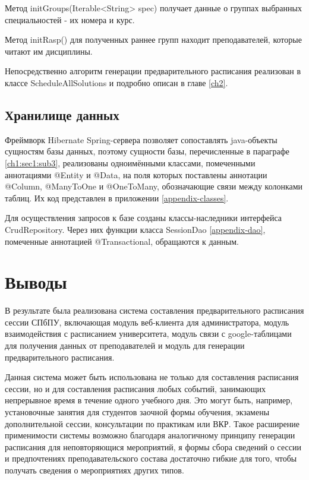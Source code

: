Метод initGroups(Iterable<String> spec) получает данные о группах выбранных специальностей - их номера и курс.

Метод initRasp() для полученных раннее групп находит преподавателей, которые читают им дисциплины.

Непосредственно алгоритм генерации предварительного расписания реализован в классе ScheduleAllSolutions и подробно описан в главе \ref{ch2}.

\subsection{Хранилище данных}
Фреймворк Hibernate Spring-сервера позволяет сопоставлять java-объекты сущностям базы данных, поэтому сущности базы, перечисленные в параграфе \ref{ch1:sec1:sub3}, реализованы одноимёнными классами, помеченными аннотациями @Entity и @Data, на поля которых поставлены аннотации @Column, @ManyToOne и @OneToMany, обозначающие связи между колонками таблиц. Их код представлен в приложении \ref{appendix-classes}.

Для осуществления запросов к базе созданы классы-наследники интерфейса CrudRepository. Через них функции класса SessionDao \ref{appendix-dao}, помеченные аннотацией @Transactional, обращаются к данным.

\section{Выводы}

В результате была реализована система составления предварительного расписания сессии СПбПУ, включающая модуль веб-клиента для администратора, модуль взаимодействия с расписанием университета, модуль связи с google-таблицами для получения данных от преподавателей и модуль для генерации предварительного расписания.

Данная система может быть использована не только для составления расписания сессии, но и для  составления расписания любых событий, занимающих непрерывное время в течение одного учебного дня. Это могут быть, например, установочные занятия для студентов заочной формы обучения, экзамены дополнительной сессии, консультации по практикам или ВКР. Такое расширение применимости системы возможно благодаря аналогичному принципу генерации расписания для неповторяющися мероприятий, я формы сбора сведений о сессии и предпочтениях преподавательского состава достаточно гибкие для того, чтобы получать сведения о мероприятиях других типов.
